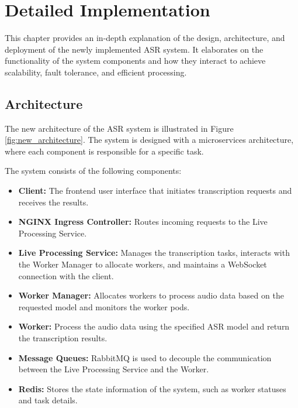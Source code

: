 \chapter{Detailed Implementation} \label{chapter:detailed_implementation}
This chapter provides an in-depth explanation of the design, architecture, and deployment of the newly implemented ASR system. It elaborates on the functionality of the system components and how they interact to achieve scalability, fault tolerance, and efficient processing.

\section{Architecture}
The new architecture of the ASR system is illustrated in Figure \ref{fig:new_architecture}. The system is designed with a microservices architecture, where each component is responsible for a specific task. 

The system consists of the following components:
\begin{itemize}
    \item \textbf{Client:} The frontend user interface that initiates transcription requests and receives the results.
    \item \textbf{NGINX Ingress Controller:} Routes incoming requests to the Live Processing Service.
    \item \textbf{Live Processing Service:} Manages the transcription tasks, interacts with the Worker Manager to allocate workers, and maintains a WebSocket connection with the client.
    \item \textbf{Worker Manager:} Allocates workers to process audio data based on the requested model and monitors the worker pods.
    \item \textbf{Worker:} Process the audio data using the specified ASR model and return the transcription results.
    \item \textbf{Message Queues:} RabbitMQ is used to decouple the communication between the Live Processing Service and the Worker.
    \item \textbf{Redis:} Stores the state information of the system, such as worker statuses and task details.
\end{itemize}

